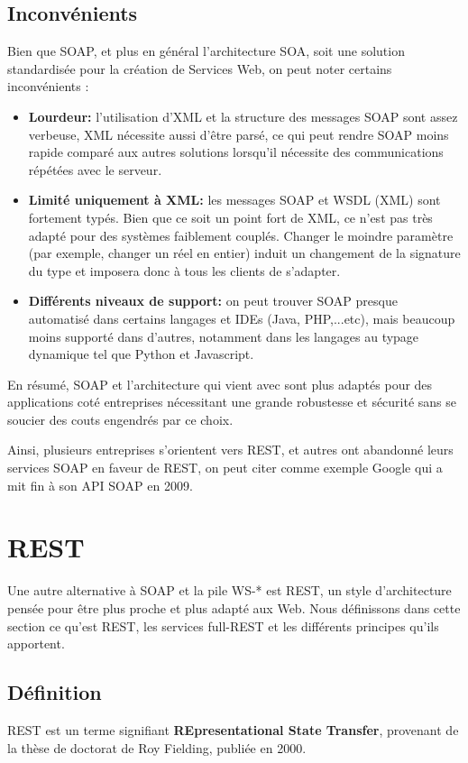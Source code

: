 \subsection{Inconvénients}
Bien que SOAP, et plus en général l'architecture SOA, soit une solution standardisée pour la création de Services Web, on peut noter certains inconvénients :
\begin{itemize}
	\item \textbf{Lourdeur:} l'utilisation d'XML et la structure des messages SOAP sont assez verbeuse, XML nécessite aussi d'être parsé, ce qui peut rendre SOAP moins rapide comparé aux autres solutions lorsqu'il nécessite des communications répétées avec le serveur.
	\item \textbf{Limité uniquement à XML:} les messages SOAP et WSDL (XML) sont fortement typés. Bien que ce soit un point fort de XML, ce n'est pas très adapté pour des systèmes faiblement couplés. Changer le moindre paramètre (par exemple, changer un réel en entier) induit un changement de la signature du type et imposera donc à tous les clients de s'adapter.
	\item \textbf{Différents niveaux de support:} on peut trouver SOAP presque automatisé dans certains langages et IDEs (Java, PHP,...etc), mais beaucoup moins supporté dans d'autres, notamment dans les langages au typage dynamique tel que Python et Javascript.
\end{itemize}

En résumé, SOAP et l'architecture qui vient avec sont plus adaptés pour des applications coté entreprises nécessitant une grande robustesse et sécurité sans se soucier des couts engendrés par ce choix.

Ainsi, plusieurs entreprises s'orientent vers REST, et autres ont abandonné leurs services SOAP en faveur de REST, on peut citer comme exemple Google qui a mit fin à son API SOAP en 2009.
\newpage

\section{REST}
Une autre alternative à SOAP et la pile WS-* est REST, un style d'architecture pensée pour être plus proche et plus adapté aux Web. Nous définissons dans cette section ce qu'est REST, les services full-REST et les différents principes qu'ils apportent.

\subsection{Définition}
REST est un terme signifiant \textbf{REpresentational State Transfer}, provenant de la thèse de doctorat de Roy Fielding, publiée en 2000.

